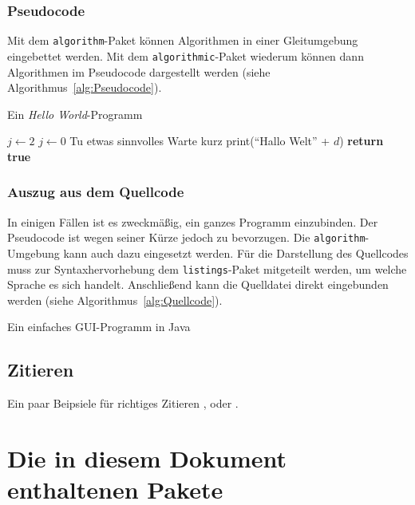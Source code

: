 \subsubsection{Pseudocode}
Mit dem \verb!algorithm!-Paket können Algorithmen in einer Gleitumgebung
eingebettet werden. Mit dem \verb!algorithmic!-Paket wiederum können dann
Algorithmen im Pseudocode dargestellt werden (siehe
Algorithmus~\ref{alg:Pseudocode}).
\begin{algorithm}[htbp]
\begin{algorithmic}[1]
\caption{Ein \textit{Hello World}-Programm}
\label{alg:Pseudocode}
  \STATE $j \leftarrow 2$
  \REPEAT
      \STATE $j \leftarrow 0$
      \STATE Tu etwas sinnvolles
    \ELSE
      \STATE Warte kurz
    \ENDIF
\ENDFOR
\STATE print("`Hallo Welt\textvisiblespace"' + $d$)
\STATE \textbf{return true}
\end{algorithmic}
\end{algorithm}

\subsubsection{Auszug aus dem Quellcode}
In einigen Fällen ist es zweckmäßig, ein ganzes Programm einzubinden. Der
Pseudocode ist wegen seiner Kürze jedoch zu bevorzugen. Die
\verb!algorithm!-Umgebung kann auch dazu eingesetzt werden. Für die Darstellung
des Quellcodes muss zur Syntaxhervorhebung dem \verb!listings!-Paket mitgeteilt
werden, um welche Sprache es sich handelt. Anschließend kann die Quelldatei
direkt eingebunden werden (siehe Algorithmus~\ref{alg:Quellcode}).
\begin{algorithm}[htbp]
\caption{Ein einfaches GUI-Programm in Java}\label{alg:Quellcode}
\lstset{language=Java}

\end{algorithm}


\subsection{Zitieren}

Ein paar Beipsiele für richtiges Zitieren \cite{Neukam2003}, oder
\cite[Kap.~2]{Neukam2003}.


\section{Die in diesem Dokument enthaltenen Pakete}

